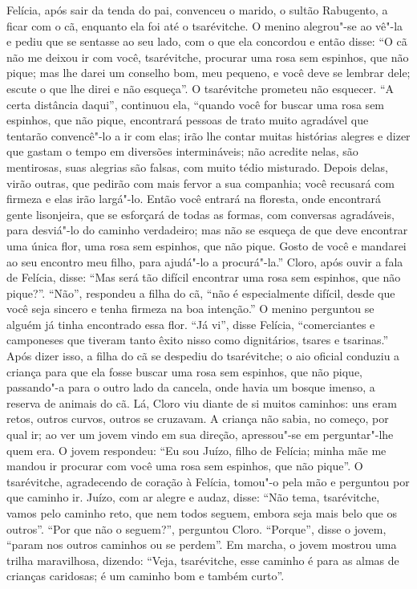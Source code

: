 Felícia, após sair da tenda do pai, convenceu o marido, o sultão
Rabugento, a ficar com o cã, enquanto ela foi até o tsarévitche. O
menino alegrou"-se ao vê"-la e pediu que se sentasse ao seu lado, com o
que ela concordou e então disse: ``O cã não me deixou ir com você,
tsarévitche, procurar uma rosa sem espinhos, que não pique; mas lhe
darei um conselho bom, meu pequeno, e você deve se lembrar dele; escute
o que lhe direi e não esqueça''. O tsarévitche prometeu não esquecer.
``A certa distância daqui'', continuou ela, ``quando você for buscar uma
rosa sem espinhos, que não pique, encontrará pessoas de trato muito
agradável que tentarão convencê"-lo a ir com elas; irão lhe contar muitas
histórias alegres e dizer que gastam o tempo em diversões intermináveis;
não acredite nelas, são mentirosas, suas alegrias são falsas, com muito
tédio misturado. Depois delas, virão outras, que pedirão com mais fervor
a sua companhia; você recusará com firmeza e elas irão largá"-lo. Então
você entrará na floresta, onde encontrará gente lisonjeira, que se
esforçará de todas as formas, com conversas agradáveis, para desviá"-lo
do caminho verdadeiro; mas não se esqueça de que deve encontrar uma
única flor, uma rosa sem espinhos, que não pique. Gosto de você e
mandarei ao seu encontro meu filho, para ajudá"-lo a procurá"-la.'' Cloro,
após ouvir a fala de Felícia, disse: ``Mas será tão difícil encontrar
uma rosa sem espinhos, que não pique?''. ``Não'', respondeu a filha do
cã, ``não é especialmente difícil, desde que você seja sincero e tenha
firmeza na boa intenção.'' O menino perguntou se alguém já tinha
encontrado essa flor. ``Já vi'', disse Felícia, ``comerciantes e
camponeses que tiveram tanto êxito nisso como dignitários, tsares e
tsarinas.'' Após dizer isso, a filha do cã se despediu do tsarévitche; o
aio oficial conduziu a criança para que ela fosse buscar uma rosa sem
espinhos, que não pique, passando"-a para o outro lado da cancela, onde
havia um bosque imenso, a reserva de animais do cã. Lá, Cloro viu diante
de si muitos caminhos: uns eram retos, outros curvos, outros se
cruzavam. A criança não sabia, no começo, por qual ir; ao ver um jovem
vindo em sua direção, apressou"-se em perguntar"-lhe quem era. O jovem
respondeu: ``Eu sou Juízo, filho de Felícia; minha mãe me mandou ir
procurar com você uma rosa sem espinhos, que não pique''. O tsarévitche,
agradecendo de coração à Felícia, tomou"-o pela mão e perguntou por que
caminho ir. Juízo, com ar alegre e audaz, disse: ``Não tema,
tsarévitche, vamos pelo caminho reto, que nem todos seguem, embora seja
mais belo que os outros''. ``Por que não o seguem?'', perguntou Cloro.
``Porque'', disse o jovem, ``param nos outros caminhos ou se perdem''.
Em marcha, o jovem mostrou uma trilha maravilhosa, dizendo: ``Veja,
tsarévitche, esse caminho é para as almas de crianças caridosas; é um
caminho bom e também curto''.

